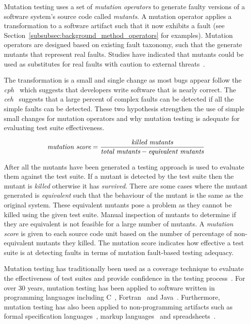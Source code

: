 Mutation testing uses a set of \emph{mutation operators} to generate faulty versions of a software system's source code called \emph{mutants}. A mutation operator applies a transformation to a software artifact such that it now exhibits a fault (see Section~\ref{subsubsec:background_method_operators} for examples). Mutation operators are designed based on existing fault taxonomy, such that the generate mutants that represent real faults. Studies have indicated that mutants could be used as substitutes for real faults with caution to external threats~\cite{ABLN06, NK11}.

The transformation is a small and single change as most bugs appear follow the \emph{\gls{cph}}~\cite{ABD+79} which suggests that developers write software that is nearly correct. The \emph{\gls{ceh}}~\cite{Off92} suggests that a large percent of complex faults can be detected if all the simple faults can be detected. These two hypothesis strengthen the use of simple small changes for mutation operators and why mutation testing is adequate for evaluating test suite effectiveness.


\begin{equation}
  \emph{$\text{mutation score} = \frac{\text{killed mutants}}{\text{total mutants} - \text{equivalent mutants}}$}
  \label{equ:mutation_score}
\end{equation}

After all the mutants have been generated a testing approach is used to evaluate them against the test suite. If a mutant is detected by the test suite then the mutant is \emph{killed} otherwise it has \emph{survived}. There are some cases where the mutant generated is \emph{equivalent} such that the behaviour of the mutant is the same as the original system. These equivalent mutants pose a problem as they cannot be killed using the given test suite. Manual inspection of mutants to determine if they are equivalent is not feasible for a large number of mutants. A \emph{mutation score} is given to each source code unit based on the number of percentage of non-equivalent mutants they killed. The mutation score indicates how effective a test suite is at detecting faults in terms of mutation fault-based testing adequacy.

Mutation testing has traditionally been used as a coverage technique to evaluate the effectiveness of test suites and provide confidence in the testing process~\cite{JH10}. For over 30 years, mutation testing has been applied to software written in programming languages including C~\cite{DM96, JH08}, Fortran~\cite{KO91} and Java~\cite{MKO02, BCD06}. Furthermore, mutation testing has also been applied to non-programming artifacts such as formal specification languages~\cite{ABM98}, markup languages~\cite{PO10} and spreadsheets~\cite{AE09}.

